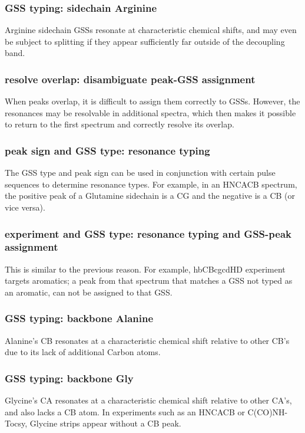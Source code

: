 \subsubsection{GSS typing: sidechain Arginine}
Arginine sidechain GSSs resonate at characteristic chemical shifts, and may
even be subject to splitting if they appear sufficiently far outside of the
decoupling band.

\subsubsection{resolve overlap: disambiguate peak-GSS assignment}
When peaks overlap, it is difficult to assign them correctly to GSSs.  However,
the resonances may be resolvable in additional spectra, which then makes it
possible to return to the first spectrum and correctly resolve its overlap.

\subsubsection{peak sign and GSS type: resonance typing}
The GSS type and peak sign can be used in conjunction with certain pulse 
sequences to determine resonance types.  For example, in an HNCACB spectrum, 
the positive peak of a Glutamine sidechain is a CG and the negative is a CB 
(or vice versa).

\subsubsection{experiment and GSS type: resonance typing and GSS-peak assignment}
This is similar to the previous reason.  
For example, hbCBcgcdHD experiment targets aromatics; a peak from that spectrum
that matches a GSS not typed as an aromatic, can not be assigned 
to that GSS.

\subsubsection{GSS typing: backbone Alanine}
Alanine's CB resonates at a characteristic chemical shift relative to other 
CB's due to its lack of additional Carbon atoms.

\subsubsection{GSS typing: backbone Gly}
Glycine's CA resonates at a characteristic chemical shift relative to other
CA's, and also lacks a CB atom.  In experiments such as an HNCACB or C(CO)NH-Tocsy,
Glycine strips appear without a CB peak.

